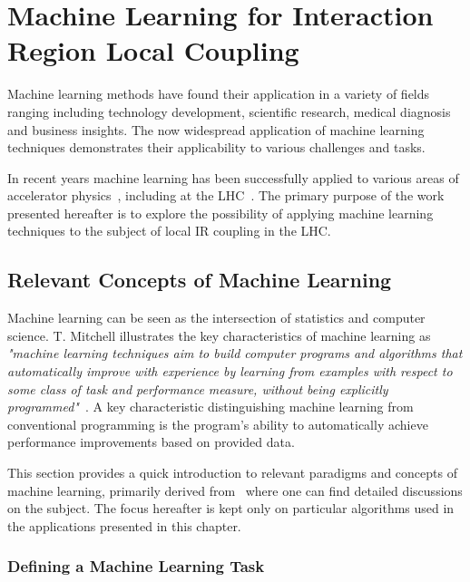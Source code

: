 \chapter{Machine Learning for Interaction Region Local Coupling} %
\label{chapter:ml_local_coupling} %

Machine learning methods have found their application in a variety of fields ranging including technology development, scientific research, medical diagnosis and business insights.
The now widespread application of machine learning techniques demonstrates their applicability to various challenges and tasks.

In recent years machine learning has been successfully applied to various areas of accelerator physics~\cite{}, including at the LHC~\cite{PRAB:Fol:Detection_Faulty_BPMs,EPJP:Fol:Supervised_Learning_Reconstruction_Magnet_Errors,PHD:Fol:Application_ML_Beam_Optics}.
The primary purpose of the work presented hereafter is to explore the possibility of applying machine learning techniques to the subject of local IR coupling in the LHC.

\section{Relevant Concepts of Machine Learning}

Machine learning can be seen as the intersection of statistics and computer science.
T. Mitchell illustrates the key characteristics of machine learning as \textit{"machine learning techniques aim to build computer programs and algorithms that automatically improve with experience by learning from examples with respect to some class of task and performance measure, without being explicitly programmed"}~\cite{BOOK:Mitchell:Machine_Learning}.
A key characteristic distinguishing machine learning from conventional programming is the program's ability to automatically achieve performance improvements based on provided data.

This section provides a quick introduction to relevant paradigms and concepts of machine learning, primarily derived from~\cite{BOOK:Mitchell:Machine_Learning,BOOK:Hastie:Elements_Statistical_Learning} where one can find detailed discussions on the subject.
The focus hereafter is kept only on particular algorithms used in the applications presented in this chapter.

\subsection{Defining a Machine Learning Task}

